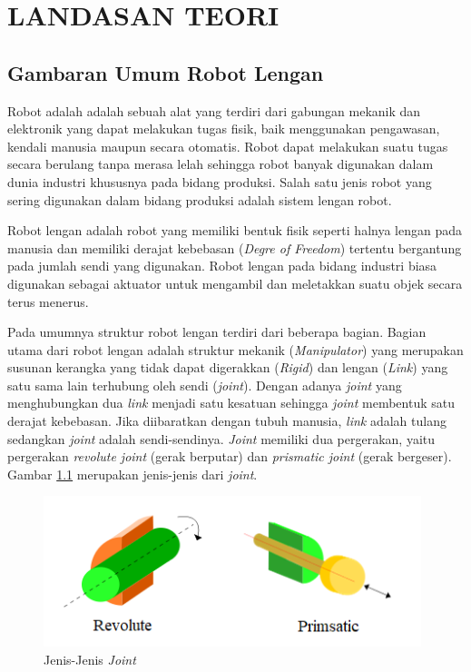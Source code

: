 \chapter{LANDASAN TEORI}

\section{Gambaran Umum Robot Lengan}

Robot adalah adalah sebuah alat yang terdiri dari gabungan mekanik dan elektronik yang dapat melakukan tugas fisik, baik menggunakan pengawasan, kendali manusia maupun secara otomatis. Robot dapat melakukan suatu tugas secara berulang tanpa merasa lelah sehingga robot banyak digunakan dalam dunia industri khususnya pada bidang produksi. Salah satu jenis robot yang sering digunakan dalam bidang produksi adalah sistem lengan robot\cite{Pandu}.

Robot lengan adalah robot yang memiliki bentuk fisik seperti halnya lengan pada manusia dan memiliki derajat kebebasan (\emph{Degre of Freedom}) tertentu bergantung pada jumlah sendi yang digunakan. Robot lengan pada bidang industri biasa digunakan sebagai aktuator untuk mengambil dan meletakkan suatu objek secara terus menerus.
	

Pada umumnya struktur robot lengan terdiri dari beberapa bagian.  Bagian utama dari robot lengan adalah struktur mekanik ({\textit{Manipulator}}) yang merupakan susunan kerangka yang tidak dapat digerakkan (\emph{Rigid}) dan lengan (\emph{Link}) yang satu sama lain terhubung oleh sendi (\emph {joint}). Dengan adanya \emph{joint} yang menghubungkan dua \emph{link} menjadi satu kesatuan sehingga \emph{joint} membentuk satu derajat kebebasan. Jika diibaratkan dengan tubuh manusia, \emph{link} adalah tulang sedangkan \emph{joint} adalah sendi-sendinya. \emph{Joint} memiliki dua pergerakan, yaitu pergerakan \emph{revolute joint} (gerak berputar) dan \emph{prismatic joint} (gerak bergeser)\cite{mahmud2012}. Gambar \ref{pic.jenisjoint} merupakan jenis-jenis dari \textit{joint}.

	\begin{figure}[H]
	\centering
	\includegraphics[width=11cm]{gambar/joint.png}
	\caption{Jenis-Jenis \textit{Joint}}
	\label{pic.jenisjoint}
\end{figure}


